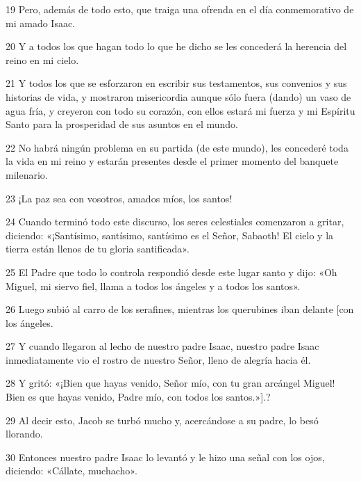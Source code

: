 \par 19 Pero, además de todo esto, que traiga una ofrenda en el día conmemorativo de mi amado Isaac.

\par 20 Y a todos los que hagan todo lo que he dicho se les concederá la herencia del reino en mi cielo.

\par 21 Y todos los que se esforzaron en escribir sus testamentos, sus convenios y sus historias de vida, y mostraron misericordia aunque sólo fuera (dando) un vaso de agua fría, y creyeron con todo su corazón, con ellos estará mi fuerza y ​​mi Espíritu Santo para la prosperidad de sus asuntos en el mundo.

\par 22 No habrá ningún problema en su partida (de este mundo), les concederé toda la vida en mi reino y estarán presentes desde el primer momento del banquete milenario.

\par 23 ¡La paz sea con vosotros, amados míos, los santos!

\par 24 Cuando terminó todo este discurso, los seres celestiales comenzaron a gritar, diciendo: «¡Santísimo, santísimo, santísimo es el Señor, Sabaoth! El cielo y la tierra están llenos de tu gloria santificada».

\par 25 El Padre que todo lo controla respondió desde este lugar santo y dijo: «Oh Miguel, mi siervo fiel, llama a todos los ángeles y a todos los santos».

\par 26 Luego subió al carro de los serafines, mientras los querubines iban delante [con los ángeles.

\par 27 Y cuando llegaron al lecho de nuestro padre Isaac, nuestro padre Isaac inmediatamente vio el rostro de nuestro Señor, lleno de alegría hacia él.

\par 28 Y gritó: «¡Bien que hayas venido, Señor mío, con tu gran arcángel Miguel! Bien es que hayas venido, Padre mío, con todos los santos.»].?

\par 29 Al decir esto, Jacob se turbó mucho y, acercándose a su padre, lo besó llorando.

\par 30 Entonces nuestro padre Isaac lo levantó y le hizo una señal con los ojos, diciendo: «Cállate, muchacho».

